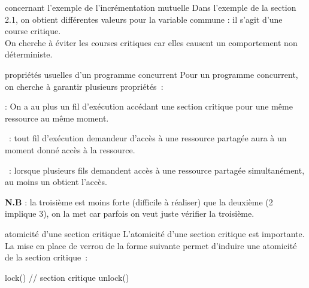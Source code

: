 \begin{adjustwidth}{-3cm}{-3cm}
\begin{remarque}{}{concernant l'exemple de l'incrémentation mutuelle}
    Dans l'exemple de la section 2.1, on obtient différentes valeurs pour la variable commune : il s'agit d'une course critique.\\
    On cherche à éviter les courses critiques car elles causent un comportement non déterministe.
\end{remarque}

\begin{definition}{}{propriétés usuelles d'un programme concurrent}
    Pour un programme concurrent, on cherche à garantir plusieurs propriétés~:
    \begin{enumeratebf}
        \item {} : On a au plus un fil d'exécution accédant une section critique pour une même ressource au même moment.
        \item {}~: tout fil d'exécution demandeur d'accès à une ressource partagée aura à un moment donné accès à la ressource.
        \item {}~: lorsque plusieurs fils demandent accès à une ressource partagée simultanément, au moins un obtient l'accès.
    \end{enumeratebf}
\end{definition}
\textbf{N.B} : la troisième est moins forte (difficile à réaliser) que la deuxième (2 implique 3), on la met car parfois on veut juste vérifier la troisième.\\

\begin{remarque}{}{atomicité d'une section critique}
    L'atomicité d'une section critique est importante. La mise en place de verrou de la forme suivante permet d'induire une atomicité de la section critique~:
    \begin{lstLNat}
        lock()
        // section critique
        unlock()
    \end{lstLNat}
\end{remarque}


\end{adjustwidth}
